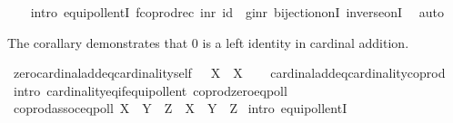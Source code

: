 \begin{isabellebody}
%
\isadelimproof
\ \ %
\endisadelimproof
%
\isatagproof
{}\isamarkupfalse%
\ {\isacharparenleft}{\kern0pt}intro\ equipollentI{\isacharbrackleft}{\kern0pt}\ {\isacharquery}{\kern0pt}f{\isacharequal}{\kern0pt}{\isachardoublequoteopen}coprod{\isacharunderscore}{\kern0pt}rec\ inr\ id{\isachardoublequoteclose}\ \ {\isacharquery}{\kern0pt}g{\isacharequal}{\kern0pt}{\isachardoublequoteopen}inr{\isachardoublequoteclose}{\isacharbrackright}{\kern0pt}\ bijection{\isacharunderscore}{\kern0pt}onI\ inverse{\isacharunderscore}{\kern0pt}onI{\isacharparenright}{\kern0pt}\isanewline
\ \ auto%
\endisatagproof
{\isafoldproof}%
%
\isadelimproof
%
\endisadelimproof
%
\begin{isamarkuptext}%
The corallary demonstrates that 0 is a left identity in cardinal addition.%
\end{isamarkuptext}\isamarkuptrue%
\isamarkupfalse%
\ zero{\isacharunderscore}{\kern0pt}cardinal{\isacharunderscore}{\kern0pt}add{\isacharunderscore}{\kern0pt}eq{\isacharunderscore}{\kern0pt}cardinality{\isacharunderscore}{\kern0pt}self{\isacharcolon}{\kern0pt}\ {\isachardoublequoteopen}{}\ {\isasymoplus}\ X\ {\isacharequal}{\kern0pt}\ {\isacharbar}{\kern0pt}X{\isacharbar}{\kern0pt}{\isachardoublequoteclose}\isanewline
%
\isadelimproof
\ \ %
\endisadelimproof
%
\isatagproof
{}\isamarkupfalse%
\ cardinal{\isacharunderscore}{\kern0pt}add{\isacharunderscore}{\kern0pt}eq{\isacharunderscore}{\kern0pt}cardinality{\isacharunderscore}{\kern0pt}coprod\isanewline
\ \ \isamarkupfalse%
\ {\isacharparenleft}{\kern0pt}intro\ cardinality{\isacharunderscore}{\kern0pt}eq{\isacharunderscore}{\kern0pt}if{\isacharunderscore}{\kern0pt}equipollent\ coprod{\isacharunderscore}{\kern0pt}zero{\isacharunderscore}{\kern0pt}eqpoll{\isacharparenright}{\kern0pt}%
\endisatagproof
{\isafoldproof}%
%
\isadelimproof
\isanewline
%
\endisadelimproof
\isanewline
{}\isamarkupfalse%
\ coprod{\isacharunderscore}{\kern0pt}assoc{\isacharunderscore}{\kern0pt}eqpoll{\isacharcolon}{\kern0pt}\ {\isachardoublequoteopen}{\isacharparenleft}{\kern0pt}X\ {\isasymCoprod}\ Y{\isacharparenright}{\kern0pt}\ {\isasymCoprod}\ Z\ {\isasymapprox}\ X\ {\isasymCoprod}\ {\isacharparenleft}{\kern0pt}Y\ {\isasymCoprod}\ Z{\isacharparenright}{\kern0pt}{\isachardoublequoteclose}\isanewline
%
\isadelimproof
%
\endisadelimproof
%
\isatagproof
{}\isamarkupfalse%
\ {\isacharparenleft}{\kern0pt}intro\ equipollentI{\isacharparenright}{\kern0pt}\isanewline
\ \ \ \isamarkupfalse%

\end{isabellebody}
